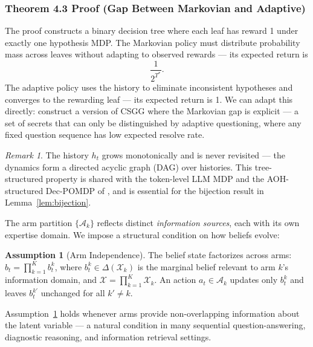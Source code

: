 \documentclass[11pt]{article}
\theoremstyle{plain}
\theoremstyle{definition}
\newtheorem{assumption}[theorem]{Assumption}
\theoremstyle{remark}
\newtheorem{remark}[theorem]{Remark}
\begin{document}
\subsubsection{Theorem 4.3 Proof (Gap Between Markovian and Adaptive)}

The proof constructs a binary decision tree where each leaf has reward 1 under exactly one hypothesis MDP. The Markovian policy must distribute probability mass across leaves without adapting to observed rewards --- its expected return is
\[
\frac{1}{2^{T^*}}.
\]
The adaptive policy uses the history to eliminate inconsistent hypotheses and converges to the rewarding leaf --- its expected return is 1. We can adapt this directly: construct a version of CSGG where the Markovian gap is explicit --- a set of secrets that can only be distinguished by adaptive questioning, where any fixed question sequence has low expected resolve rate.




\begin{remark}
The history $h_t$ grows monotonically and is never revisited — 
the dynamics form a directed acyclic graph (DAG) over histories. 
This tree-structured property is shared with the token-level LLM 
MDP \citep{rafailov2024r} and the AOH-structured Dec-POMDP of 
\citet{obel2021}, and is essential for the bijection result in 
Lemma~\ref{lem:bijection}.
\end{remark}

The arm partition $\{\mathcal{A}_k\}$ reflects distinct 
\emph{information sources}, each with its own expertise domain. 
We impose a structural condition on how beliefs evolve:

\begin{assumption}[Arm Independence]
\label{assump:arm-independence}
The belief state factorizes across arms:
$b_t = \prod_{k=1}^{K} b_t^k$,
where $b_t^k \in \Delta(\mathcal{X}_k)$ is the marginal belief 
relevant to arm $k$'s information domain, and 
$\mathcal{X} = \prod_{k=1}^K \mathcal{X}_k$.
An action $a_t \in \mathcal{A}_k$ updates only $b_t^k$ and 
leaves $b_t^{k'}$ unchanged for all $k' \neq k$.
\end{assumption}

Assumption~\ref{assump:arm-independence} holds whenever arms 
provide non-overlapping information about the latent variable — 
a natural condition in many sequential question-answering, 
diagnostic reasoning, and information retrieval settings.

\end{document}
